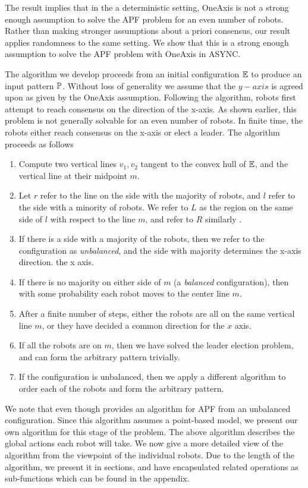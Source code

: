 \documentclass[preprint,10pt]{elsarticle}
\begin{document}
	The result implies that in the a deterministic setting, OneAxis is not a strong enough 
	assumption to solve the APF problem for an even number of robots. Rather than making 
	stronger assumptions about a priori consensus, our result applies randomness to the same setting. 
	We show that this is a strong enough assumption to solve the 
	APF problem with OneAxis in ASYNC. 

	The algorithm we develop proceeds from an initial configuration $\mathbb{E}$ to produce an input pattern $\mathbb{P}$.
	Without loss of generality we assume that the $y-axis$ is agreed upon as given by the OneAxis assumption.
	Following the algorithm, robots first attempt to reach consensus on the direction of the x-axis. 
	As shown earlier, this problem is not generally solvable for an even number of robots. In finite time, 
	the robots either reach consensus on the x-axis or elect a leader. The algorithm proceeds as follows
	\begin{enumerate}
		\item Compute two vertical lines $v_1,v_2$ tangent to the convex hull of $\mathbb{E}$, and the vertical line
		at their midpoint $m$. 
		\item Let $r$ refer to the line on the side with the majority of robots, and $l$ refer to the side
		with a minority of robots. We refer to $L$ as the region on the same side of $l$ with respect to 
		the line $m$, and refer to $R$ similarly .
		\item If there is a side with a majority of the robots, then we refer to the configuration as
		\textit{unbalanced}, and the side with majority determines the x-axis direction.
		the x axis.
		\item If there is no majority on either side of $m$ (a \textit{balanced } configuration), 
		then with some probability each robot moves to the center line $m$. 
		\item After a finite number of steps, either the robots are all on the same vertical line $m$,
		or they have decided a common direction for the $x$ axis.
		\item If all the robots are on $m$, then we have solved the leader election problem, and 
		can form the arbitrary pattern trivially.
		\item If the configuration is unbalanced, then we apply a different algorithm to order each
		of the robots and form the arbitrary pattern.
	\end{enumerate}

	We note that even though \cite{flocchini12distrib} provides an algorithm for APF from an unbalanced configuration.
	Since this algorithm assumes a point-based model, we present our own algorithm for this stage of
	the problem. The above algorithm describes the global actions each robot will take. 
	We now give a more detailed view of the algorithm from the viewpoint of the individual robots.
	Due to the length of the algorithm, we present it in sections, and have encapsulated related 
	operations as sub-functions which can be found in the appendix.
\end{document}
